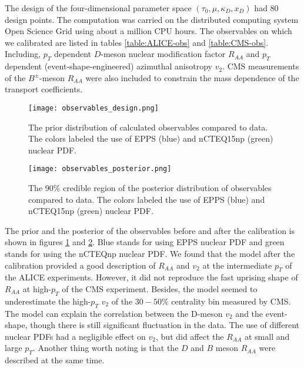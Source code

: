 The design of the four-dimensional parameter space  $(\tau_0, \mu, \kappa_D, x_D)$ had 80 design points.
The computation was carried on the distributed computing system Open Science Grid \cite{Pordes:2007zzb,Sfiligoi:2010zz} using about a million CPU hours.
The observables on which we calibrated are listed in tables \ref{table:ALICE-obs} and \ref{table:CMS-obs}. 
Including, $p_T$ dependent $D$-meson nuclear modification factor $R_{AA}$ and $p_T$ dependent (event-shape-engineered) azimuthal anisotropy $v_2$.
CMS measurements of the $B^{\pm}$-meson $R_{AA}$ were also included to constrain the mass dependence of the transport coefficients.

\begin{figure}
\singlespacing
\texttt{[image: observables\_design.png]}
\caption[The prior distribution of calculated observables compared to data.]{The prior distribution of calculated observables compared to data. The colors labeled the use of EPPS (blue) and nCTEQ15np (green) nuclear PDF.}
\label{fig:LBT:obs_prior}
\end{figure}

\begin{figure}
\singlespacing
\texttt{[image: observables\_posterior.png]}
\caption[The 90\% credible region of the posterior distribution of observables]{The 90\% credible region of the posterior distribution of observables compared to data. The colors labeled the use of EPPS (blue) and nCTEQ15np (green) nuclear PDF.}
\label{fig:LBT:obs_posterior}
\end{figure}

The prior and the posterior of the observables before and after the calibration is shown in figures \ref{fig:LBT:obs_prior} and \ref{fig:LBT:obs_posterior}.
Blue stands for using EPPS nuclear PDF and green stands for using the nCTEQnp nuclear PDF.
We found that the model after the calibration provided a good description of $R_{AA}$ and $v_2$ at the intermediate $p_T$ of the ALICE experiments.
However, it did not reproduce the fast uprising shape of $R_{AA}$ at high-$p_T$ of the CMS experiment.
Besides, the model seemed to underestimate the high-$p_T$ $v_2$ of the $30-50\%$ centrality bin measured by CMS.
The model can explain the correlation between the D-meson $v_2$ and the event-shape, though there is still significant fluctuation in the data.
The use of different nuclear PDFs had a negligible effect on $v_2$, but did affect the $R_{AA}$ at small and large $p_T$.
Another thing worth noting is that the $D$ and $B$ meson $R_{AA}$ were described at the same time.

